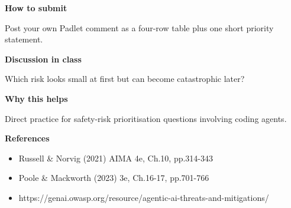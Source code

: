 \documentclass[11pt]{article}
\begin{document}
\begin{tcolorbox}[colback=white,colframe=MidnightBlue,title={Q3 Structured Problem},fonttitle=\bfseries,breakable]
{\large\bfseries\color{MidnightBlue} How to submit}\par\medskip
Post your own Padlet comment as a four-row table plus one short priority statement.

{\large\bfseries\color{MidnightBlue} Discussion in class}\par\medskip
Which risk looks small at first but can become catastrophic later?

{\large\bfseries\color{MidnightBlue} Why this helps}\par\medskip
Direct practice for safety-risk prioritisation questions involving coding agents.

{\large\bfseries\color{MidnightBlue} References}\par\medskip
\begin{itemize}\item Russell \& Norvig (2021) AIMA 4e, Ch.10, pp.314-343
\item Poole \& Mackworth (2023) 3e, Ch.16-17, pp.701-766
\item https://genai.owasp.org/resource/agentic-ai-threats-and-mitigations/\end{itemize}
\end{tcolorbox}
\end{document}
